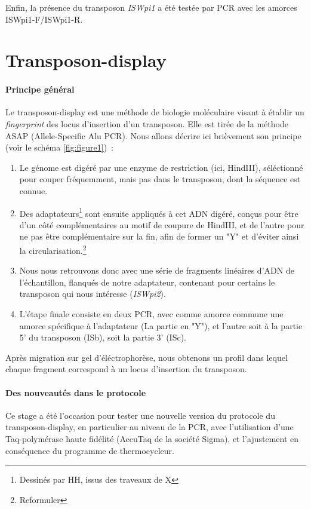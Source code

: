 	Enfin, la présence du transposon \textit{ISWpi1} a été testée par PCR avec les amorces ISWpi1-F/ISWpi1-R.

\section{Transposon-display} %
\label{sec:transposon_display}

	\paragraph{Principe général} %
	\label{par:principe_TnDisp}
	Le transposon-display est une méthode de biologie moléculaire visant à établir un \textit{fingerprint} des locus d’insertion d’un transposon. 
	Elle est tirée de la méthode ASAP (Allele-Specific Alu PCR)\cite{ASAP}.
	Nous allons décrire ici brièvement son principe (voir le schéma \ref{fig:figure1})~:
	\begin{enumerate}
		\item Le génome est digéré par une enzyme de restriction (ici, HindIII), séléctionné pour couper fréquemment, mais pas dans le transposon, dont la séquence est connue.
		\item Des adaptateurs\footnote{Dessinés par HH, issus des traveaux de X} sont ensuite appliqués à cet ADN digéré, conçus pour être d’un côté complémentaires au motif de coupure de HindIII, et de l’autre pour ne pas être complémentaire sur la fin, afin de former un "Y" et d’éviter ainsi la circularisation.\footnote{Reformuler}
		\item Nous nous retrouvons donc avec une série de fragments linéaires d’ADN de l’échantillon, flanqués de notre adaptateur, contenant pour certains le transposon qui nous intéresse (\textit{ISWpi2}).
		\item L’étape finale consiste en deux PCR, avec comme amorce commune une amorce spécifique à l’adaptateur (La partie en "Y"), et l’autre soit à la partie 5’ du transposon (ISb), soit la partie 3’ (ISc).
	\end{enumerate}
	Après migration sur gel d’éléctrophorèse, nous obtenons un profil dans lequel chaque fragment correspond à un locus d’insertion du transposon.

	\paragraph{Des nouveautés dans le protocole} %
	\label{par:protocole2}
	Ce stage a été l’occasion pour tester une nouvelle version du protocole du transposon-display, en particulier au niveau de la PCR, avec l’utilisation d’une Taq-polymérase haute fidélité (AccuTaq de la société Sigma), et l’ajustement en conséquence du programme de thermocycleur.

